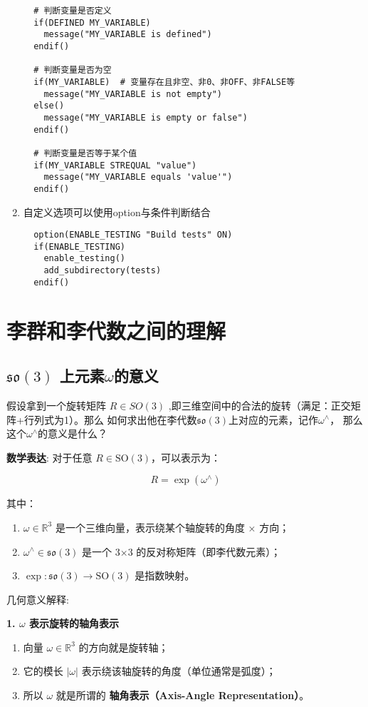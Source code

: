 \documentclass{article}
\begin{document}
\begin{enumerate}[leftmargin=1cm]
\begin{verbatim}
  # 判断变量是否定义
  if(DEFINED MY_VARIABLE)
    message("MY_VARIABLE is defined")
  endif()

  # 判断变量是否为空
  if(MY_VARIABLE)  # 变量存在且非空、非0、非OFF、非FALSE等
    message("MY_VARIABLE is not empty")
  else()
    message("MY_VARIABLE is empty or false")
  endif()

  # 判断变量是否等于某个值
  if(MY_VARIABLE STREQUAL "value")
    message("MY_VARIABLE equals 'value'")
  endif()

  \end{verbatim}

\item 自定义选项可以使用option与条件判断结合
  \begin{verbatim}
  option(ENABLE_TESTING "Build tests" ON)
  if(ENABLE_TESTING)
    enable_testing()
    add_subdirectory(tests)
  endif()
  \end{verbatim}

\end{enumerate}

\newpage
\section{李群和李代数之间的理解}
\subsection{$\mathfrak{so}(3)$ 上元素$\omega$的意义}
假设拿到一个旋转矩阵 $ R \in SO(3)$ ,即三维空间中的合法的旋转（满足：正交矩阵+行列式为1）。那么
如何求出他在李代数$\mathfrak{so}(3)$上对应的元素，记作$\omega ^{\wedge} $，
那么这个$\omega ^{\wedge} $的意义是什么？


\textbf{数学表达}:
对于任意 $ R \in \text{SO}(3) $，可以表示为：

$$
R = \exp(\omega^\wedge)
$$

其中：
\begin{enumerate}
  \item $ \omega \in \mathbb{R}^3 $ 是一个三维向量，表示绕某个轴旋转的角度 × 方向；
  \item $ \omega^\wedge \in \mathfrak{so}(3) $ 是一个 3×3 的反对称矩阵（即李代数元素）；
  \item $\exp: \mathfrak{so}(3) \to \text{SO}(3)$ 是指数映射。
\end{enumerate}


几何意义解释:

\textbf{1. $ \omega $ 表示旋转的轴角表示}
\begin{enumerate}
  \item 向量 $ \omega \in \mathbb{R}^3 $ 的方向就是旋转轴；
  \item 它的模长 $ |\omega| $ 表示绕该轴旋转的角度（单位通常是弧度）；
  \item 所以 $ \omega $ 就是所谓的 \textbf{轴角表示（Axis-Angle Representation）}。
\end{enumerate}
\end{document}
